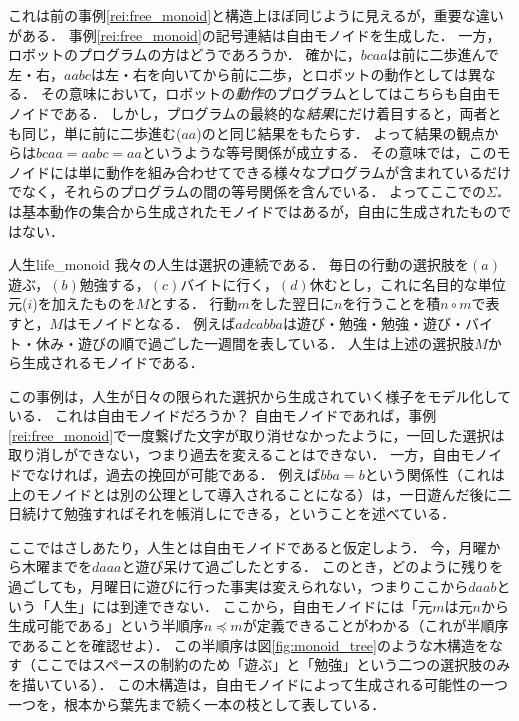 \documentclass[11pt,a4paper, dvipdfmx]{jsarticle}
\begin{document}
これは前の事例\ref{rei:free_monoid}と構造上ほぼ同じように見えるが，重要な違いがある．
事例\ref{rei:free_monoid}の記号連結は自由モノイドを生成した．
一方，ロボットのプログラムの方はどうであろうか．
確かに，$bcaa$は前に二歩進んで左・右，$aabc$は左・右を向いてから前に二歩，とロボットの動作としては異なる．
その意味において，ロボットの\emph{動作}のプログラムとしてはこちらも自由モノイドである．
しかし，プログラムの最終的な\emph{結果}にだけ着目すると，両者とも同じ，単に前に二歩進む($aa$)のと同じ結果をもたらす．
よって結果の観点からは$bcaa = aabc = aa$というような等号関係が成立する．
その意味では，このモノイドには単に動作を組み合わせてできる様々なプログラムが含まれているだけでなく，それらのプログラムの間の等号関係を含んでいる．
よってここでの$\Sigma_*$は基本動作の集合から生成されたモノイドではあるが，自由に生成されたものではない．



\begin{rei}{人生}{life_monoid}
    我々の人生は選択の連続である．
    毎日の行動の選択肢を$(a)$ 遊ぶ，$(b)$勉強する，$(c)$バイトに行く，$(d)$休むとし，これに名目的な単位元($i$)を加えたものを$M$とする．
    行動$m$をした翌日に$n$を行うことを積$n \circ m$で表すと，$M$はモノイドとなる．
    例えば$adcabba$は遊び・勉強・勉強・遊び・バイト・休み・遊びの順で過ごした一週間を表している．
    人生は上述の選択肢$M$から生成されるモノイドである．
\end{rei}

この事例は，人生が日々の限られた選択から生成されていく様子をモデル化している．
これは自由モノイドだろうか？
自由モノイドであれば，事例\ref{rei:free_monoid}で一度繋げた文字が取り消せなかったように，一回した選択は取り消しができない，つまり過去を変えることはできない．
一方，自由モノイドでなければ，過去の挽回が可能である．
例えば$bba = b$という関係性（これは上のモノイドとは別の公理として導入されることになる）は，一日遊んだ後に二日続けて勉強すればそれを帳消しにできる，ということを述べている．

ここではさしあたり，人生とは自由モノイドであると仮定しよう．
今，月曜から木曜までを$daaa$と遊び呆けて過ごしたとする．
このとき，どのように残りを過ごしても，月曜日に遊びに行った事実は変えられない，つまりここから$daab$という「人生」には到達できない．
ここから，自由モノイドには「元$m$は元$n$から生成可能である」という半順序$n \preceq m$が定義できることがわかる（これが半順序であることを確認せよ）．
この半順序は図\ref{fig:monoid_tree}のような木構造をなす（ここではスペースの制約のため「遊ぶ」と「勉強」という二つの選択肢のみを描いている）．
この木構造は，自由モノイドによって生成される可能性の一つ一つを，根本から葉先まで続く一本の枝として表している．
\end{document}
